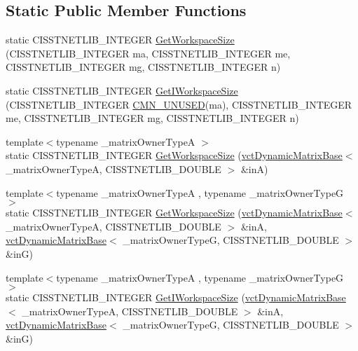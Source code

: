\subsection*{Static Public Member Functions}
\begin{DoxyCompactItemize}
\item 
static C\+I\+S\+S\+T\+N\+E\+T\+L\+I\+B\+\_\+\+I\+N\+T\+E\+G\+E\+R \hyperlink{classnmr_l_sq_lin_solution_dynamic_adf34e64190ee54f3ea7d9aa1848bf7e9}{Get\+Workspace\+Size} (C\+I\+S\+S\+T\+N\+E\+T\+L\+I\+B\+\_\+\+I\+N\+T\+E\+G\+E\+R ma, C\+I\+S\+S\+T\+N\+E\+T\+L\+I\+B\+\_\+\+I\+N\+T\+E\+G\+E\+R me, C\+I\+S\+S\+T\+N\+E\+T\+L\+I\+B\+\_\+\+I\+N\+T\+E\+G\+E\+R mg, C\+I\+S\+S\+T\+N\+E\+T\+L\+I\+B\+\_\+\+I\+N\+T\+E\+G\+E\+R n)
\item 
static C\+I\+S\+S\+T\+N\+E\+T\+L\+I\+B\+\_\+\+I\+N\+T\+E\+G\+E\+R \hyperlink{classnmr_l_sq_lin_solution_dynamic_a8a2a1b7329620b6bce6f0519428b33fd}{Get\+I\+Workspace\+Size} (C\+I\+S\+S\+T\+N\+E\+T\+L\+I\+B\+\_\+\+I\+N\+T\+E\+G\+E\+R \hyperlink{cmn_portability_8h_a021894e2626935fa2305434b1e893ff6}{C\+M\+N\+\_\+\+U\+N\+U\+S\+E\+D}(ma), C\+I\+S\+S\+T\+N\+E\+T\+L\+I\+B\+\_\+\+I\+N\+T\+E\+G\+E\+R me, C\+I\+S\+S\+T\+N\+E\+T\+L\+I\+B\+\_\+\+I\+N\+T\+E\+G\+E\+R mg, C\+I\+S\+S\+T\+N\+E\+T\+L\+I\+B\+\_\+\+I\+N\+T\+E\+G\+E\+R n)
\item 
{\footnotesize template$<$typename \+\_\+matrix\+Owner\+Type\+A $>$ }\\static C\+I\+S\+S\+T\+N\+E\+T\+L\+I\+B\+\_\+\+I\+N\+T\+E\+G\+E\+R \hyperlink{classnmr_l_sq_lin_solution_dynamic_ab0b85a963b72c6a336dad329fab500fa}{Get\+Workspace\+Size} (\hyperlink{classvct_dynamic_matrix_base}{vct\+Dynamic\+Matrix\+Base}$<$ \+\_\+matrix\+Owner\+Type\+A, C\+I\+S\+S\+T\+N\+E\+T\+L\+I\+B\+\_\+\+D\+O\+U\+B\+L\+E $>$ \&in\+A)
\item 
{\footnotesize template$<$typename \+\_\+matrix\+Owner\+Type\+A , typename \+\_\+matrix\+Owner\+Type\+G $>$ }\\static C\+I\+S\+S\+T\+N\+E\+T\+L\+I\+B\+\_\+\+I\+N\+T\+E\+G\+E\+R \hyperlink{classnmr_l_sq_lin_solution_dynamic_a403e05b68004e8e302efe38ed77bd325}{Get\+Workspace\+Size} (\hyperlink{classvct_dynamic_matrix_base}{vct\+Dynamic\+Matrix\+Base}$<$ \+\_\+matrix\+Owner\+Type\+A, C\+I\+S\+S\+T\+N\+E\+T\+L\+I\+B\+\_\+\+D\+O\+U\+B\+L\+E $>$ \&in\+A, \hyperlink{classvct_dynamic_matrix_base}{vct\+Dynamic\+Matrix\+Base}$<$ \+\_\+matrix\+Owner\+Type\+G, C\+I\+S\+S\+T\+N\+E\+T\+L\+I\+B\+\_\+\+D\+O\+U\+B\+L\+E $>$ \&in\+G)
\item 
{\footnotesize template$<$typename \+\_\+matrix\+Owner\+Type\+A , typename \+\_\+matrix\+Owner\+Type\+G $>$ }\\static C\+I\+S\+S\+T\+N\+E\+T\+L\+I\+B\+\_\+\+I\+N\+T\+E\+G\+E\+R \hyperlink{classnmr_l_sq_lin_solution_dynamic_a3365706bb493a44fc5ead21f6acef5dc}{Get\+I\+Workspace\+Size} (\hyperlink{classvct_dynamic_matrix_base}{vct\+Dynamic\+Matrix\+Base}$<$ \+\_\+matrix\+Owner\+Type\+A, C\+I\+S\+S\+T\+N\+E\+T\+L\+I\+B\+\_\+\+D\+O\+U\+B\+L\+E $>$ \&in\+A, \hyperlink{classvct_dynamic_matrix_base}{vct\+Dynamic\+Matrix\+Base}$<$ \+\_\+matrix\+Owner\+Type\+G, C\+I\+S\+S\+T\+N\+E\+T\+L\+I\+B\+\_\+\+D\+O\+U\+B\+L\+E $>$ \&in\+G)

\end{DoxyCompactItemize}
